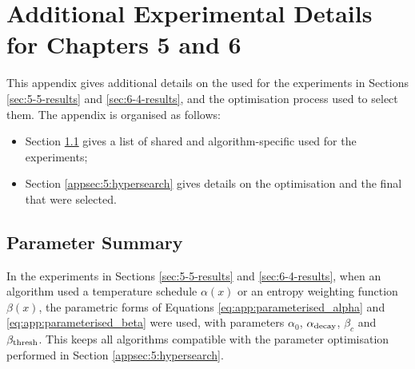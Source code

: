 










\chapter{\label{app:expr-deets-ch5}Additional Experimental Details for Chapters 5 and 6}

    \minitoc

    This appendix gives additional details on the  used for the experiments in Sections \ref{sec:5-5-results} and \ref{sec:6-4-results}, and the optimisation process used to select them. The appendix is organised as follows:
    \begin{itemize}
        \item Section \ref{appsec:5:hyperparams} gives a list of shared and algorithm-specific  used for the experiments;
        \item Section \ref{appsec:5:hypersearch} gives details on the  optimisation and the final  that were selected.
    \end{itemize}


\section{Parameter Summary}
\label{appsec:5:hyperparams}

    In the experiments in Sections \ref{sec:5-5-results} and \ref{sec:6-4-results}, when an algorithm used a temperature schedule $\alpha(x)$ or an entropy weighting function $\beta(x)$, the parametric forms of Equations \eqref{eq:app:parameterised_alpha} and \eqref{eq:app:parameterised_beta} were used, with parameters $\alpha_0$, ${\alpha_{\text{decay}}}$, $\beta_c$ and ${\beta_{\text{thresh}}}$. This keeps all algorithms compatible with the parameter optimisation performed in Section \ref{appsec:5:hypersearch}.


